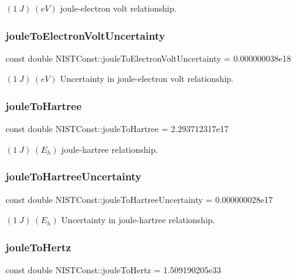 $(1\ J) \ (eV)$ joule-\/electron volt relationship. \mbox{\label{group___joule_ga36506e3cfb40cd74646e95340c9c4721}} 
\subsubsection{\texorpdfstring{joule\+To\+Electron\+Volt\+Uncertainty}{jouleToElectronVoltUncertainty}}
{\footnotesize\ttfamily const double N\+I\+S\+T\+Const\+::joule\+To\+Electron\+Volt\+Uncertainty = 0.\+000000038e18}

$(1\ J) \ (eV)$ Uncertainty in joule-\/electron volt relationship. \mbox{\label{group___joule_gac067d2d31bf56c3abe63559dac6c00d7}} 
\subsubsection{\texorpdfstring{joule\+To\+Hartree}{jouleToHartree}}
{\footnotesize\ttfamily const double N\+I\+S\+T\+Const\+::joule\+To\+Hartree = 2.\+293712317e17}

$(1\ J) \ (E_h)$ joule-\/hartree relationship. \mbox{\label{group___joule_ga503d276676014580036110b6554bd974}} 
\subsubsection{\texorpdfstring{joule\+To\+Hartree\+Uncertainty}{jouleToHartreeUncertainty}}
{\footnotesize\ttfamily const double N\+I\+S\+T\+Const\+::joule\+To\+Hartree\+Uncertainty = 0.\+000000028e17}

$(1\ J) \ (E_h)$ Uncertainty in joule-\/hartree relationship. \mbox{\label{group___joule_ga6ac361417bc6b472bf80fcfef276d742}} 
\subsubsection{\texorpdfstring{joule\+To\+Hertz}{jouleToHertz}}
{\footnotesize\ttfamily const double N\+I\+S\+T\+Const\+::joule\+To\+Hertz = 1.\+509190205e33}

